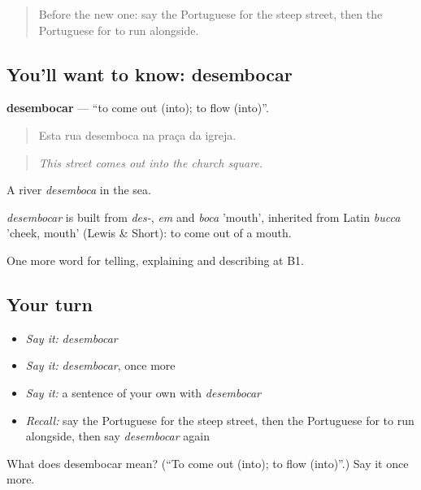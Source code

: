 \label{lesson:PT-C438-desembocar}



\begin{quote}
Before the new one: say the Portuguese for the steep street, then the Portuguese for to run alongside.
\end{quote}

\subsection*{You'll want to know: desembocar}
\textbf{desembocar} — \textquotedblleft{}to come out (into); to flow (into)\textquotedblright{}.

\begin{quote}
Esta rua desemboca na praça da igreja.
\end{quote}

\begin{quote}
\emph{This street comes out into the church square.}
\end{quote}

A river \emph{desemboca} in the sea.

\begin{cousinweb}
\emph{desembocar} is built from \emph{des-}, \emph{em} and \emph{boca} 'mouth', inherited from Latin \emph{bucca} 'cheek, mouth' (Lewis \& Short): to come out of a mouth.
\end{cousinweb}

\begin{grammarlens}[title={What you've built}]
One more word for telling, explaining and describing at B1.
\end{grammarlens}

\subsection*{Your turn}
\begin{itemize}
\raggedright
  \item \emph{Say it:} \emph{desembocar}
  \item \emph{Say it:} \emph{desembocar}, once more
  \item \emph{Say it:} a sentence of your own with \emph{desembocar}
  \item \emph{Recall:} say the Portuguese for the steep street, then the Portuguese for to run alongside, then say \emph{desembocar} again
\end{itemize}

\begin{tcolorbox}[breakable,colback=teal!4,colframe=teal!35!black,title={Before you move on}]
What does desembocar mean? (\textquotedblleft{}To come out (into); to flow (into)\textquotedblright{}.) Say it once more.
\end{tcolorbox}
